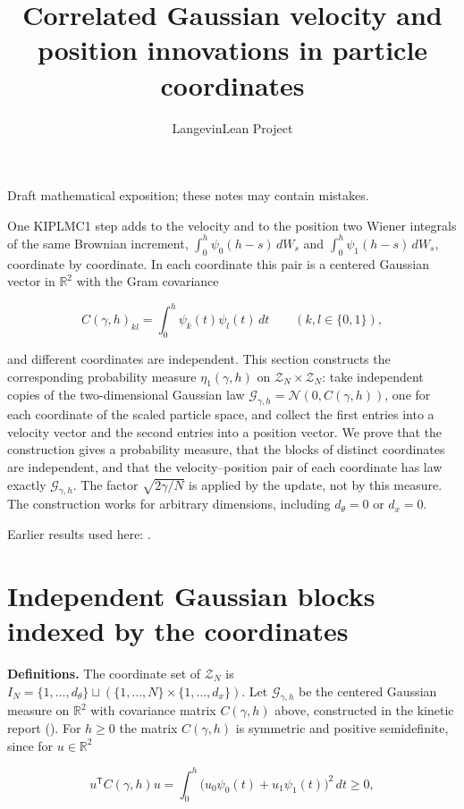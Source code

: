 \documentclass[11pt,a4paper]{article}
\title{\texorpdfstring{Correlated Gaussian velocity and position innovations in particle coordinates}{Correlated Gaussian velocity and position innovations in particle coordinates}}
\author{LangevinLean Project}
\date{}
\begin{document}
\maketitle
Draft mathematical exposition; these notes may contain mistakes.


One KIPLMC1 step adds to the velocity and to the position two Wiener integrals of the same Brownian increment, \(\int_0^h\psi_0(h-s)\,dW_s\) and \(\int_0^h\psi_1(h-s)\,dW_s\), coordinate by coordinate. In each coordinate this pair is a centered Gaussian vector in \(\mathbb R^2\) with the Gram covariance


\[C(\gamma,h)_{kl}=\int_0^h\psi_k(t)\psi_l(t)\,dt\qquad(k,l\in\{0,1\}),\]


and different coordinates are independent. This section constructs the corresponding probability measure \(\eta_1(\gamma,h)\) on \(\mathcal Z_N\times\mathcal Z_N\): take independent copies of the two-dimensional Gaussian law \(\mathcal G_{\gamma,h}=\mathcal N(0,C(\gamma,h))\), one for each coordinate of the scaled particle space, and collect the first entries into a velocity vector and the second entries into a position vector. We prove that the construction gives a probability measure, that the blocks of distinct coordinates are independent, and that the velocity–position pair of each coordinate has law exactly \(\mathcal G_{\gamma,h}\). The factor \(\sqrt{2\gamma/N}\) is applied by the update, not by this measure. The construction works for arbitrary dimensions, including \(d_\theta=0\) or \(d_x=0\).



Earlier results used here: \cite[Section~3.26]{LangevinLean2026Kinetic}.

\section{\texorpdfstring{Independent Gaussian blocks indexed by the coordinates}{Independent Gaussian blocks indexed by the coordinates}}


\textbf{Definitions.} The coordinate set of \(\mathcal Z_N\) is \(I_N=\{1,\dots,d_\theta\}\sqcup(\{1,\dots,N\}\times\{1,\dots,d_x\})\). Let \(\mathcal G_{\gamma,h}\) be the centered Gaussian measure on \(\mathbb R^2\) with covariance matrix \(C(\gamma,h)\) above, constructed in the kinetic report (\cite[Section~3.26.3]{LangevinLean2026Kinetic}). For \(h\ge0\) the matrix \(C(\gamma,h)\) is symmetric and positive semidefinite, since for \(u\in\mathbb R^2\)


\[u^{\mathsf T}C(\gamma,h)u=\int_0^h\bigl(u_0\psi_0(t)+u_1\psi_1(t)\bigr)^2\,dt\ge0,\]
\end{document}
